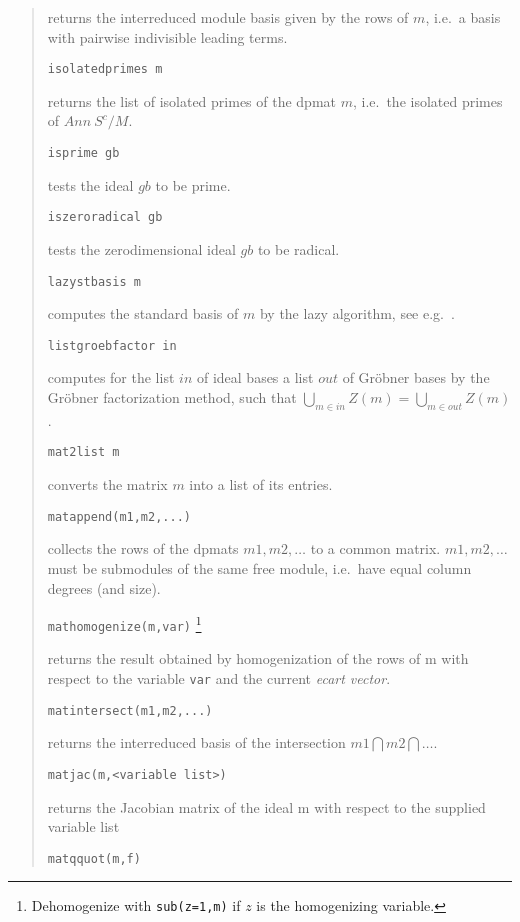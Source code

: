 \documentclass[a4paper,11pt]{article}
\newcommand{\gr}{Gr\"obner}
\newcommand{\ind}[1]{{\em #1}\index{#1}}
\newcommand{\pbx}[1]{\mbox{}\hfill \parbox[t]{12cm}{#1} \pagebreak[3]}
\begin{document}
\begin{quote}
\pbx{returns the interreduced module basis given by the rows of $m$,
i.e.\ a basis with pairwise indivisible leading terms.}

\verb|isolatedprimes m| 

\pbx{returns the list of isolated primes of the dpmat $m$, i.e.\ the
isolated primes of $Ann\ S^c/M$.}

\verb|isprime gb| 

\pbx{tests the ideal $gb$ to be prime.}

\verb|iszeroradical gb| 

\pbx{tests the zerodimensional ideal $gb$ to be radical.}

\verb|lazystbasis m| 

\pbx{computes the standard basis of $m$ by the lazy algorithm, see
e.g.\ \cite{MPT}.} 

\verb|listgroebfactor in| 

\pbx{computes for the list $in$ of ideal bases a list $out$ of {\gr}
bases by the {\gr} factorization method, such that 
$\bigcup_{m\in in}Z(m) = \bigcup_{m\in out}Z(m)$.} 

\verb|mat2list m| 

\pbx{converts the matrix $m$ into a list of its entries.}

\verb|matappend(m1,m2,...)| 

\pbx{collects the rows of the dpmats $m1,m2,\ldots $ to a common
matrix. $m1,m2,\ldots$ must be submodules of the same free module,
i.e.\ have equal column degrees (and size).}

\verb|mathomogenize(m,var)| 
\footnote{Dehomogenize with {\tt sub(z=1,m)} if $z$ is the
homogenizing variable.}

\pbx{returns the result obtained by homogenization of the rows of m
with respect to the variable {\tt var} and the current \ind{ecart
vector}.}

\verb|matintersect(m1,m2,...)| 

\pbx{returns the interreduced basis of the intersection $m1\bigcap
m2\bigcap \ldots$.}

\verb|matjac(m,<variable list>)| 

\pbx{returns the Jacobian matrix of the ideal m with respect to the 
supplied variable list}

\verb|matqquot(m,f)| 


\end{quote}
\end{document}
